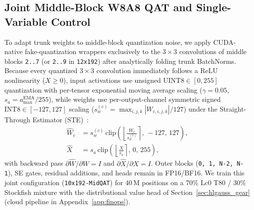 \documentclass[10pt,twocolumn]{article}
\begin{document}
\subsection{Joint Middle-Block W8A8 QAT and Single-Variable Control}
To adapt trunk weights to middle-block quantization noise, we apply CUDA-native fake-quantization wrappers exclusively to the $3\times 3$ convolutions of middle blocks \texttt{2..7} (or \texttt{2..9} in \texttt{12x192}) after analytically folding trunk BatchNorms. Because every quantized $3\times 3$ convolution immediately follows a $\mathrm{ReLU}$ nonlinearity ($X \ge 0$), input activations use unsigned $\mathrm{UINT8} \in [0, 255]$ quantization with per-tensor exponential moving average scaling ($\gamma=0.05$, $s_a = a_{\max}^{\mathrm{EMA}}/255$), while weights use per-output-channel symmetric signed $\mathrm{INT8} \in [-127, 127]$ scaling ($s_w^{(c)} = \max_{i,j,k}|W_{c,i,j,k}| / 127$) under the Straight-Through Estimator (STE)~\cite{bengio2013ste,nagel2021whitepaper}:
\begin{align}
  \widehat{W}_c &= s_w^{(c)}\,\mathrm{clip}\!\left(\left\lfloor \frac{W_c}{s_w^{(c)}} \right\rceil,\,-127,\,127\right), \label{eq:wq}\\
  \widehat{X} &= s_a\,\mathrm{clip}\!\left(\left\lfloor \frac{X}{s_a} \right\rceil,\,0,\,255\right), \label{eq:aq}
\end{align}
with backward pass $\partial \widehat{W}/\partial W = I$ and $\partial \widehat{X}/\partial X = I$. Outer blocks (\texttt{0, 1, N-2, N-1}), SE gates, residual additions, and heads remain in FP16/BF16. We train this joint configuration (\texttt{10x192-MidQAT}) for 40\,M positions on a 70\% Lc0 T80 / 30\% Stockfish mixture with the distributional value head of Section~\ref{sec:hlgauss_gear} (cloud pipeline in Appendix~\ref{app:finops}).
\end{document}
